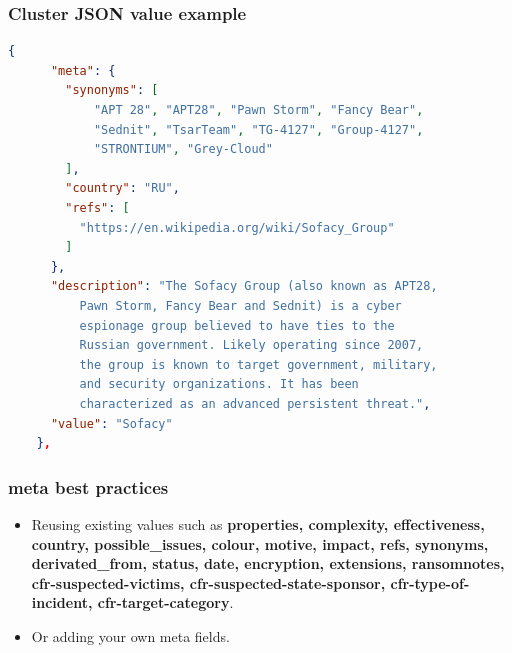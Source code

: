 \begin{frame}[fragile]
	\frametitle{Cluster JSON value example}
    \begin{adjustbox}{keepaspectratio}
        \begin{lstlisting}[language=json,firstnumber=1]
    {
      "meta": {
        "synonyms": [
            "APT 28", "APT28", "Pawn Storm", "Fancy Bear",
            "Sednit", "TsarTeam", "TG-4127", "Group-4127",
            "STRONTIUM", "Grey-Cloud"
        ],
        "country": "RU",
        "refs": [
          "https://en.wikipedia.org/wiki/Sofacy_Group"
        ]
      },
      "description": "The Sofacy Group (also known as APT28,
          Pawn Storm, Fancy Bear and Sednit) is a cyber
          espionage group believed to have ties to the
          Russian government. Likely operating since 2007,
          the group is known to target government, military,
          and security organizations. It has been
          characterized as an advanced persistent threat.",
      "value": "Sofacy"
    },

        \end{lstlisting}
    \end{adjustbox}
\end{frame}

\begin{frame}[fragile]
        \frametitle{meta best practices}
        \begin{itemize}
        \item Reusing existing values such as {\bf properties, complexity, effectiveness, country, possible\_issues, colour, motive, impact, refs, synonyms, derivated\_from, status, date, encryption, extensions, ransomnotes, cfr-suspected-victims, cfr-suspected-state-sponsor, cfr-type-of-incident, cfr-target-category}.
        \item Or adding your own meta fields.
        \end{itemize}
\end{frame}

